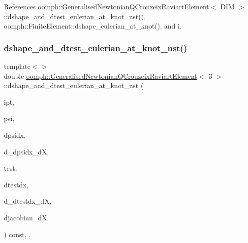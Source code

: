 References oomph\+::\+Generalised\+Newtonian\+Q\+Crouzeix\+Raviart\+Element$<$ D\+I\+M $>$\+::dshape\+\_\+and\+\_\+dtest\+\_\+eulerian\+\_\+at\+\_\+knot\+\_\+nst(), oomph\+::\+Finite\+Element\+::dshape\+\_\+eulerian\+\_\+at\+\_\+knot(), and i.

\mbox{\label{classoomph_1_1GeneralisedNewtonianQCrouzeixRaviartElement_ac25045f98811380b97a00ffd657993b1}} 
\subsubsection{\texorpdfstring{dshape\+\_\+and\+\_\+dtest\+\_\+eulerian\+\_\+at\+\_\+knot\+\_\+nst()}{dshape\_and\_dtest\_eulerian\_at\_knot\_nst()}\hspace{0.1cm}{\footnotesize\ttfamily [4/4]}}
{\footnotesize\ttfamily template$<$$>$ \\
double \hyperlink{classoomph_1_1GeneralisedNewtonianQCrouzeixRaviartElement}{oomph\+::\+Generalised\+Newtonian\+Q\+Crouzeix\+Raviart\+Element}$<$ 3 $>$\+::dshape\+\_\+and\+\_\+dtest\+\_\+eulerian\+\_\+at\+\_\+knot\+\_\+nst (\begin{DoxyParamCaption}\item[{const unsigned \&}]{ipt,  }\item[{\hyperlink{classoomph_1_1Shape}{Shape} \&}]{psi,  }\item[{\hyperlink{classoomph_1_1DShape}{D\+Shape} \&}]{dpsidx,  }\item[{\hyperlink{classoomph_1_1RankFourTensor}{Rank\+Four\+Tensor}$<$ double $>$ \&}]{d\+\_\+dpsidx\+\_\+dX,  }\item[{\hyperlink{classoomph_1_1Shape}{Shape} \&}]{test,  }\item[{\hyperlink{classoomph_1_1DShape}{D\+Shape} \&}]{dtestdx,  }\item[{\hyperlink{classoomph_1_1RankFourTensor}{Rank\+Four\+Tensor}$<$ double $>$ \&}]{d\+\_\+dtestdx\+\_\+dX,  }\item[{\hyperlink{classoomph_1_1DenseMatrix}{Dense\+Matrix}$<$ double $>$ \&}]{djacobian\+\_\+dX }\end{DoxyParamCaption}) const\hspace{0.3cm}{\ttfamily [inline]}, {\ttfamily [protected]}, {\ttfamily [virtual]}}

